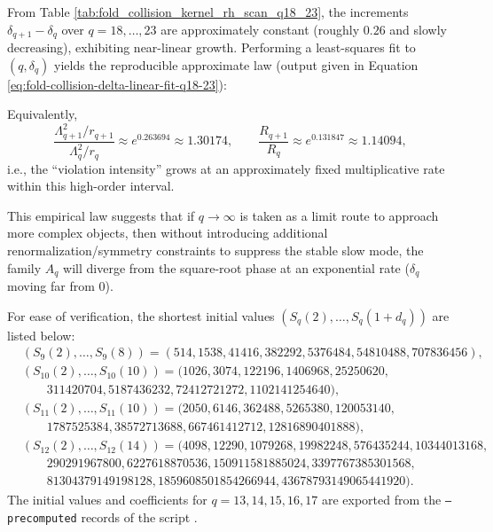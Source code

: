 \begin{remark}[Near-linear law of high-order \texorpdfstring{$\delta_q$}{deltaq} (\(q=18,\dots,23\))]\label{rem:pom-collision-kernel-rh-linear}
From Table \ref{tab:fold_collision_kernel_rh_scan_q18_23}, the increments
\(\delta_{q+1}-\delta_q\) over \(q=18,\dots,23\) are approximately constant (roughly \(0.26\) and slowly decreasing), exhibiting near-linear growth.
Performing a least-squares fit to \((q,\delta_q)\) yields the reproducible approximate law (output given in Equation \eqref{eq:fold-collision-delta-linear-fit-q18-23}):

Equivalently,
\[
\frac{\Lambda_{q+1}^2/r_{q+1}}{\Lambda_q^2/r_q}\approx e^{0.263694}\approx 1.30174,
\qquad
\frac{R_{q+1}}{R_q}\approx e^{0.131847}\approx 1.14094,
\]
i.e., the ``violation intensity'' grows at an approximately fixed multiplicative rate within this high-order interval.
\par
This empirical law suggests that if \(q\to\infty\) is taken as a limit route to approach more complex objects, then without introducing additional renormalization/symmetry constraints to suppress the stable slow mode, the family \(A_q\) will diverge from the square-root phase at an exponential rate (\(\delta_q\) moving far from \(0\)).
\end{remark}



\begin{remark}[Shortest initial values for the high-order recursion (\(q=9,10,11,12\))]\label{rem:pom-moment-init-9-12}
For ease of verification, the shortest initial values \((S_q(2),\dots,S_q(1+d_q))\) are listed below:
$$
\begin{aligned}
&(S_9(2),\dots,S_9(8))=(514,1538,41416,382292,5376484,54810488,707836456),\\
&(S_{10}(2),\dots,S_{10}(10))=(1026,3074,122196,1406968,25250620,\\
&\qquad 311420704,5187436232,72412721272,1102141254640),\\
&(S_{11}(2),\dots,S_{11}(10))=(2050,6146,362488,5265380,120053140,\\
&\qquad 1787525384,38572713688,667461412712,12816890401888),\\
&(S_{12}(2),\dots,S_{12}(14))=(4098,12290,1079268,19982248,576435244,10344013168,\\
&\qquad 290291967800,6227618870536,150911581885024,3397767385301568,\\
&\qquad 81304379149198128,1859608501854266944,43678793149065441920).
\end{aligned}
$$
The initial values and coefficients for \(q=13,14,15,16,17\) are exported from the \texttt{--precomputed} records of the script .
\end{remark}


